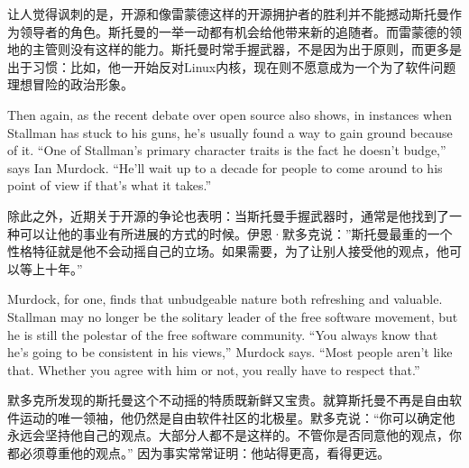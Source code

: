 \ifdefined\chs
让人觉得讽刺的是，开源和像雷蒙德这样的开源拥护者的胜利并不能撼动斯托曼作为领导者的角色。斯托曼的一举一动都有机会给他带来新的追随者。而雷蒙德的领地的主管则没有这样的能力。斯托曼时常手握武器，不是因为出于原则，而更多是出于习惯：比如，他一开始反对Linux内核，现在则不愿意成为一个为了软件问题理想冒险的政治形象。
\fi



\ifdefined\eng
Then again, as the recent debate over open source also shows, in instances when Stallman has stuck to his guns, he's usually found a way to gain ground because of it. ``One of Stallman's primary character traits is the fact he doesn't budge,'' says Ian Murdock. ``He'll wait up to a decade for people to come around to his point of view if that's what it takes.''
\fi

\ifdefined\chs
除此之外，近期关于开源的争论也表明：当斯托曼手握武器时，通常是他找到了一种可以让他的事业有所进展的方式的时候。伊恩·默多克说：”斯托曼最重的一个性格特征就是他不会动摇自己的立场。如果需要，为了让别人接受他的观点，他可以等上十年。”
\fi

\ifdefined\eng
Murdock, for one, finds that unbudgeable nature both refreshing and valuable. Stallman may no longer be the solitary leader of the free software movement, but he is still the polestar of the free software community. ``You always know that he's going to be consistent in his views,'' Murdock says. ``Most people aren't like that. Whether you agree with him or not, you really have to respect that.''
\fi

\ifdefined\chs
默多克所发现的斯托曼这个不动摇的特质既新鲜又宝贵。就算斯托曼不再是自由软件运动的唯一领袖，他仍然是自由软件社区的北极星。默多克说：“你可以确定他永远会坚持他自己的观点。大部分人都不是这样的。不管你是否同意他的观点，你都必须尊重他的观点。” 因为事实常常证明：他站得更高，看得更远。
\fi

\theendnotes
\setcounter{endnote}{0}
